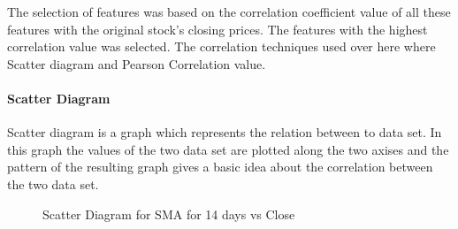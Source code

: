 \documentclass[5p,,preprint,12pt,twocolumn]{elsarticle}
\makeatletter
\def\fixFloatSize#1{}%
\makeatother
\begin{document}
The selection of features was based on the correlation coefficient value of all these features with the original stock's closing prices. The features with the highest correlation value was selected. The correlation techniques used over here where Scatter diagram and Pearson Correlation value.



\paragraph{Scatter Diagram}Scatter diagram is a graph which represents the relation between to data set. In this graph the values of the two data set are plotted along the two axises and the pattern of the resulting graph gives a basic idea about the correlation between the two data set.


\bgroup
\fixFloatSize{images/7c7a74a9-4e3d-4b17-97f3-6b9a6684b180-uscatter-diagram-ma14-days.png}
\begin{figure}[!htbp]
\centering \makeatletter{}
\makeatother 
\caption{{Scatter Diagram for SMA for 14 days vs Close}}
\label{f-fe2e0386c34e}
\end{figure}
\egroup
\end{document}
